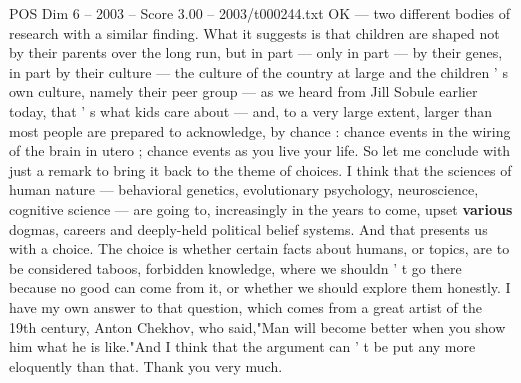 \begin{textsample}{POS Dim 6 – 2003 – Score 3.00 – 2003/t000244.txt}
OK — two different bodies of research with a similar finding.
What it suggests is that children are shaped not by their parents over the long run, but in part — only in part — by their genes, in part by their culture — the culture of the country at large and the children ' s own culture, namely their peer group — as we heard from Jill Sobule earlier today, that ' s what kids care about — and, to a very large extent, larger than most people are prepared to acknowledge, by chance : chance events in the wiring of the brain in utero ; chance events as you live your life.
So let me conclude with just a remark to bring it back to the theme of choices.
I think that the sciences of human nature — behavioral genetics, evolutionary psychology, neuroscience, cognitive science — are going to, increasingly in the years to come, upset \textbf{various} dogmas, careers and deeply-held political belief systems.
And that presents us with a choice.
The choice is whether certain facts about humans, or topics, are to be considered taboos, forbidden knowledge, where we shouldn ' t go there because no good can come from it, or whether we should explore them honestly.
I have my own answer to that question, which comes from a great artist of the 19th century, Anton Chekhov, who said,"Man will become better when you show him what he is like."And I think that the argument can ' t be put any more eloquently than that.
Thank you very much.

\end{textsample}
